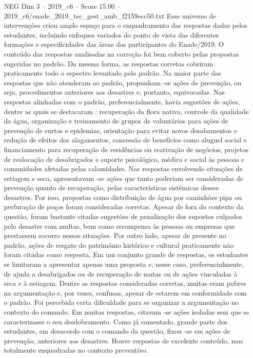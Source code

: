 \begin{textsample}{NEG Dim 3 – 2019\_c6 – Score 15.00 – 2019\_c6/enade\_2019\_tec\_gest\_amb\_f2159ecc50.txt}
Esse universo de intervenções criou amplo espaço para o enquadramento das respostas dadas pelos estudantes, incluindo enfoques variados do ponto de vista das diferentes formações e especificidades das áreas dos participantes do Enade/2019.
O conteúdo das respostas analisadas na correção foi bem coberto pelas propostas sugeridas no padrão.
Da mesma forma, as respostas corretas cobriram praticamente todo o espectro levantado pelo padrão.
Na maior parte das respostas que não atenderam ao padrão, propunham -se ações de prevenção, ou seja, procedimentos anteriores aos desastres e, portanto, equivocadas.
Nas respostas alinhadas com o padrão, preferencialmente, havia sugestões de ações, dentre as quais se destacaram : recuperação da flora nativa, controle da qualidade da água, organização e treinamento de grupos de voluntários para ações de prevenção de surtos e epidemias, orientação para evitar novos desabamentos e redução de efeitos dos alagamentos, concessão de benefícios como aluguel social e financiamento para recuperação de residências ou reativação de negócios, projetos de realocação de desabrigados e suporte psicológico, médico e social às pessoas e comunidades afetadas pelas calamidades.
Nas respostas envolvendo situações de estiagem e seca, apresentavam -se ações que tanto poderiam ser consideradas de prevenção quanto de recuperação, pelas características sistêmicas desses desastres.
Por isso, propostas como distribuição de água por caminhões pipa ou perfuração de poços foram consideradas corretas.
Apesar de fora do contexto da questão, foram bastante citadas sugestões de penalização dos supostos culpados pelo desastre com multas, bem como recompensa às pessoas ou empresas que prestassem socorro nessas situações.
Por outro lado, apesar de presente no padrão, ações de resgate do patrimônio histórico e cultural praticamente não foram citadas como resposta.
Em um conjunto grande de respostas, os estudantes se limitaram a apresentar apenas uma proposta e, nesse caso, preferencialmente, de ajuda a desabrigados ou de recuperação de matas ou de ações vinculadas à seca e à estiagem.
Dentre as respostas consideradas corretas, muitas eram pobres na argumentação e, por vezes, confusas, apesar de estarem em conformidade com o padrão.
Foi percebida certa dificuldade para se organizar a argumentação no contexto do comando.
Em muitas respostas, citavam -se ações isoladas sem que se caracterizasse o seu desdobramento.
Como já comentado, grande parte dos estudantes, em desacordo com o comando da questão, fixou -se em ações de prevenção, anteriores aos desastres.
Houve respostas de excelente conteúdo, mas totalmente enquadradas no contexto preventivo.

\end{textsample}
